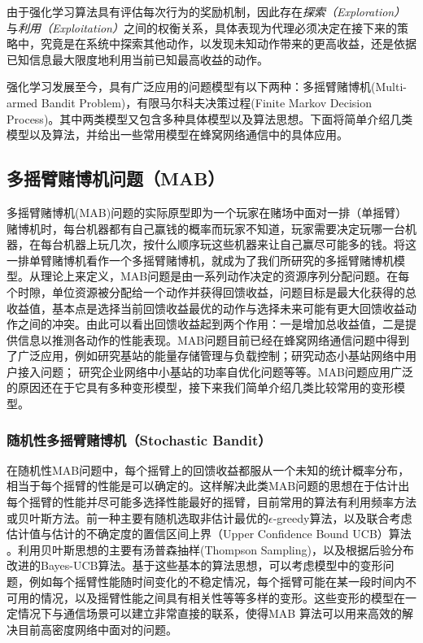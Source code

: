 ﻿\documentclass[11pt,draftclsnofoot,onecolumn,journal,letterpaper]{IEEEtran}
\begin{document}
由于强化学习算法具有评估每次行为的奖励机制，因此存在\emph{探索（Exploration）}与\emph{利用（Exploitation）}之间的权衡关系，具体表现为代理必须决定在接下来的策略中，究竟是在系统中探索其他动作，以发现未知动作带来的更高收益，还是依据已知信息最大限度地利用当前已知最高收益的动作。

强化学习发展至今，具有广泛应用的问题模型有以下两种：多摇臂赌博机(Multi-armed Bandit Problem)，有限马尔科夫决策过程(Finite Markov Decision Process)。其中两类模型又包含多种具体模型以及算法思想。下面将简单介绍几类模型以及算法，并给出一些常用模型在蜂窝网络通信中的具体应用。


\subsection{多摇臂赌博机问题（MAB）}
多摇臂赌博机(MAB)问题的实际原型即为一个玩家在赌场中面对一排（单摇臂）赌博机时，每台机器都有自己赢钱的概率而玩家不知道，玩家需要决定玩哪一台机器，在每台机器上玩几次，按什么顺序玩这些机器来让自己赢尽可能多的钱。将这一排单臂赌博机看作一个多摇臂赌博机，就成为了我们所研究的多摇臂赌博机模型。从理论上来定义，MAB问题是由一系列动作决定的资源序列分配问题。在每个时隙，单位资源被分配给一个动作并获得回馈收益，问题目标是最大化获得的总收益值，基本点是选择当前回馈收益最优的动作与选择未来可能有更大回馈收益动作之间的冲突。由此可以看出回馈收益起到两个作用：一是增加总收益值，二是提供信息以推测各动作的性能表现。MAB问题目前已经在蜂窝网络通信问题中得到了广泛应用，例如\cite{Zhang2017}研究基站的能量存储管理与负载控制；\cite{Maghsudi2017}研究动态小基站网络中用户接入问题；\cite{Wang2017} 研究企业网络中小基站的功率自优化问题等等。MAB问题应用广泛的原因还在于它具有多种变形模型，接下来我们简单介绍几类比较常用的变形模型。
\subsubsection{随机性多摇臂赌博机（Stochastic Bandit）}
在随机性MAB问题中，每个摇臂上的回馈收益都服从一个未知的统计概率分布，相当于每个摇臂的性能是可以确定的。这样解决此类MAB问题的思想在于估计出每个摇臂的性能并尽可能多选择性能最好的摇臂，目前常用的算法有利用频率方法或贝叶斯方法。前一种主要有随机选取非估计最优的$\epsilon$-greedy算法\cite{Sutton2016}，以及联合考虑估计值与估计的不确定度的置信区间上界（Upper Confidence Bound UCB）算法       \cite{Auer2002a}。利用贝叶斯思想的主要有汤普森抽样(Thompson Sampling)\cite{Agrawal2012}\cite{Kaufmann2012}，以及根据后验分布改进的Bayes-UCB算法\cite{Kaufmann2012a}。基于这些基本的算法思想，可以考虑模型中的变形问题，例如每个摇臂性能随时间变化的不稳定情况，每个摇臂可能在某一段时间内不可用的情况，以及摇臂性能之间具有相关性等等多样的变形。这些变形的模型在一定情况下与通信场景可以建立非常直接的联系，使得MAB 算法可以用来高效的解决目前高密度网络中面对的问题。
\end{document}
